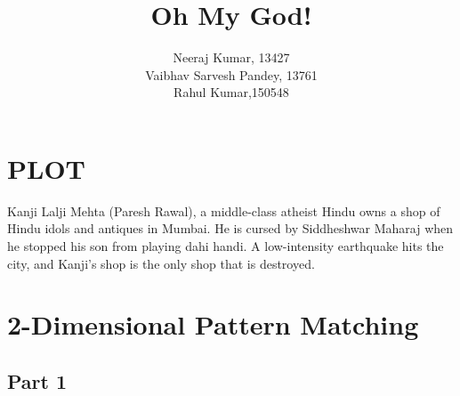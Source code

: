 \documentclass[a4paper]{article}
\title{Oh My God! }
\author{Neeraj Kumar, 13427\\
	Vaibhav Sarvesh Pandey, 13761\\
	Rahul Kumar,150548}
\begin{document}
	\maketitle
	
	\section{PLOT}
Kanji Lalji Mehta (Paresh Rawal), a middle-class atheist Hindu owns a shop of Hindu idols and antiques in Mumbai. He is cursed by Siddheshwar Maharaj when he stopped his son from playing dahi handi. A low-intensity earthquake hits the city, and Kanji's shop is the only shop that is destroyed.	
	
	\section{2-Dimensional Pattern Matching}
	
	    \subsection{Part 1}
	    	        
	        
	            
	        
	        
	        
	    
	    
	

	
	
\end{document}

